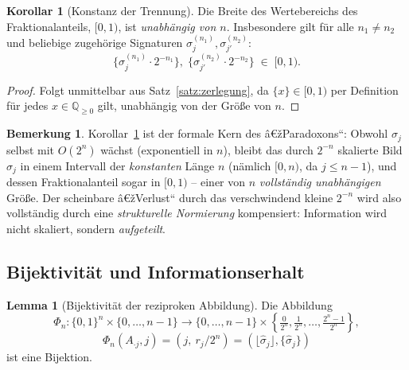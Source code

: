 ﻿\documentclass[a4paper,12pt]{article}
\theoremstyle{definition}
\newtheorem{lemma}{Lemma}
\newtheorem{bemerkung}{Bemerkung}
\newtheorem{korollar}{Korollar}
\begin{document}
\begin{korollar}[Konstanz der Trennung]
\label{kor:konstanz}
	Die Breite des Wertebereichs des Fraktionalanteils, $[0,1)$, ist
	\emph{unabhängig von $n$}. Insbesondere gilt für alle $n_1 \neq n_2$ und
	beliebige zugehörige Signaturen $\sigma^{(n_1)}_j, \sigma^{(n_2)}_{j'}$:
	\[
		\{\sigma^{(n_1)}_j \cdot 2^{-n_1}\},\;
		\{\sigma^{(n_2)}_{j'} \cdot 2^{-n_2}\} \;\in\; [0,1).
	\]
\end{korollar}

\begin{proof}
	Folgt unmittelbar aus Satz~\ref{satz:zerlegung}, da $\{x\}\in[0,1)$ per
	Definition für jedes $x\in\mathbb{Q}_{\geq0}$ gilt, unabhängig von der
	Größe von $n$.
\end{proof}

\begin{bemerkung}
	Korollar~\ref{kor:konstanz} ist der formale Kern des â€žParadoxons``: Obwohl
	$\sigma_j$ selbst mit $O(2^n)$ wächst (exponentiell in $n$), bleibt das
	durch $2^{-n}$ skalierte Bild $\hat\sigma_j$ in einem Intervall der
	\emph{konstanten} Länge $n$ (nämlich $[0,n)$, da $j \leq n-1$), und
	dessen Fraktionalanteil sogar in $[0,1)$ -- einer von $n$
	\emph{vollständig unabhängigen} Größe. Der scheinbare â€žVerlust`` durch
	das verschwindend kleine $2^{-n}$ wird also vollständig durch eine
	\emph{strukturelle Normierung} kompensiert: Information wird nicht
	skaliert, sondern \emph{aufgeteilt}.
\end{bemerkung}

\subsection{Bijektivität und Informationserhalt}

\begin{lemma}[Bijektivität der reziproken Abbildung]
\label{lem:bijektiv}
	Die Abbildung
	\[
		\Phi_n : \{0,1\}^n \times \{0,\ldots,n-1\} \longrightarrow
		\{0,\ldots,n-1\} \times \left\{\tfrac{0}{2^n},\tfrac{1}{2^n},\ldots,\tfrac{2^n-1}{2^n}\right\},
	\]
	\[
		\Phi_n(A_{\cdot j}, j) = (j,\ r_j/2^n) = (\lfloor\hat\sigma_j\rfloor, \{\hat\sigma_j\})
	\]
	ist eine Bijektion.
\end{lemma}
\end{document}
